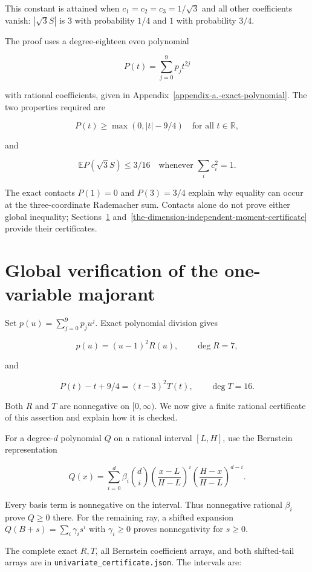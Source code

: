 \documentclass[11pt]{article}
\begin{document}
This constant is attained when \(c_1=c_2=c_3=1/\sqrt3\) and all other
coefficients vanish: \(|\sqrt3S|\) is \(3\) with probability \(1/4\) and
\(1\) with probability \(3/4\).

The proof uses a degree-eighteen even polynomial

\[P(t)=\sum_{j=0}^9p_jt^{2j} \tag{4}\]

with rational coefficients, given in Appendix~\ref{appendix-a.-exact-polynomial}. The two properties
required are

\[P(t)\ge\max(0,|t|-9/4)\quad\text{for all }t\in\mathbb R, \tag{5}\]

and

\[\mathbb E P(\sqrt3S)\le3/16\quad\text{whenever }\sum_i c_i^2=1. \tag{6}\]

The exact contacts \(P(1)=0\) and \(P(3)=3/4\)
explain why equality can occur at the three-coordinate Rademacher sum.
Contacts alone do not prove either global inequality;
Sections~\ref{global-verification-of-the-one-variable-majorant}
and~\ref{the-dimension-independent-moment-certificate} provide their
certificates.

\section{Global verification of the one-variable majorant}\label{global-verification-of-the-one-variable-majorant}

Set \(p(u)=\sum_{j=0}^9p_ju^j\). Exact polynomial division gives

\[p(u)=(u-1)^2R(u),\qquad \deg R=7, \tag{7}\]

and

\[P(t)-t+9/4=(t-3)^2T(t),\qquad \deg T=16. \tag{8}\]

Both \(R\) and \(T\) are nonnegative on \([0,\infty)\). We now give a
finite rational certificate of this assertion and explain how it is
checked.

For a degree-\(d\) polynomial \(Q\) on a rational interval \([L,H]\),
use the Bernstein representation

\[Q(x)=\sum_{i=0}^d\beta_i\binom di
 \left(\frac{x-L}{H-L}\right)^i
 \left(\frac{H-x}{H-L}\right)^{d-i}. \tag{9}\]

Every basis term is nonnegative on the interval. Thus nonnegative
rational \(\beta_i\) prove \(Q\ge0\) there. For the remaining ray, a
shifted expansion \(Q(B+s)=\sum_i\gamma_i s^i\) with \(\gamma_i\ge0\)
proves nonnegativity for \(s\ge0\).

The complete exact \(R,T\), all Bernstein coefficient arrays, and both
shifted-tail arrays are in \texttt{univariate\_certificate.json}. The
intervals are:
\end{document}
